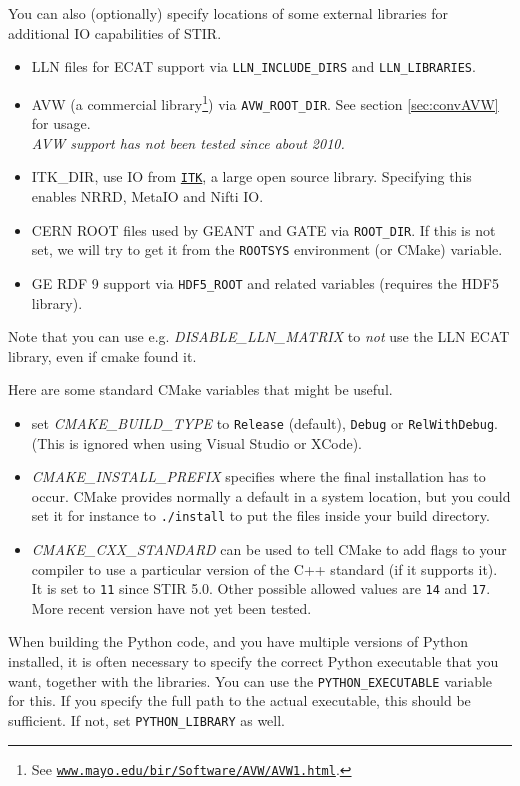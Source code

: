 \documentclass{article}
\def\url#1#2{\mbox{\href{#1}{\tt #2}}}
\begin{document}
You can also (optionally) specify locations of some external libraries for additional IO
capabilities of STIR. 
\begin{itemize}
\item LLN files for ECAT support via \texttt{LLN\_INCLUDE\_DIRS} and \texttt{LLN\_LIBRARIES}.
\item AVW\texttrademark{} (a commercial library\footnote{See \url{http://www.mayo.edu/bir/Software/AVW/AVW1.html}
{www.mayo.edu/bir/Software/AVW/AVW1.html}.})
via \texttt{AVW\_ROOT\_DIR}. See section \ref{sec:convAVW} for usage.\\
\textit{AVW support has not been tested since about 2010.}
\item ITK\_DIR, use IO from \url{http://www.itk.org}{ITK}, a large open source library. Specifying this
 enables NRRD, MetaIO and Nifti IO.
\item CERN ROOT files used by GEANT and GATE via \texttt{ROOT\_DIR}.
  If this is not set, we will try to get it from the \texttt{ROOTSYS} environment (or CMake) variable.
\item GE RDF\texttrademark{} 9 support via \texttt{HDF5\_ROOT} and related variables (requires the HDF5 library).
\end{itemize}

Note that you can use e.g. \textit{DISABLE\_LLN\_MATRIX} to \textit{not}
use the LLN ECAT library, even if cmake found it.

Here are some standard CMake variables that might be useful.
\begin{itemize}
\item set \textit{CMAKE\_BUILD\_TYPE} to \texttt{Release} (default), \texttt{Debug} or \texttt{RelWithDebug}.
(This is ignored when using Visual Studio or XCode).
\item \textit{CMAKE\_INSTALL\_PREFIX} specifies where the final installation has to occur. CMake
provides normally a default in a system location, but you could set it for instance to
\texttt{./install} to put the files inside your build directory.
\item \textit{CMAKE\_CXX\_STANDARD} can be used to tell CMake to add flags to your compiler to use
a particular version of the C++ standard (if it supports it). It is set 
to \texttt{11} since STIR 5.0. Other possible allowed values are
\texttt{14} and \texttt{17}. More recent version have not yet been tested.
\end{itemize}

When building the Python code, and you have multiple versions of Python installed,
it is often necessary to specify the correct Python executable that you want, together with
the libraries. You can use the \texttt{PYTHON\_EXECUTABLE} variable for this. If you
specify the full path to the actual executable, this should be sufficient. If not, set
\texttt{PYTHON\_LIBRARY} as well.
\end{document}

